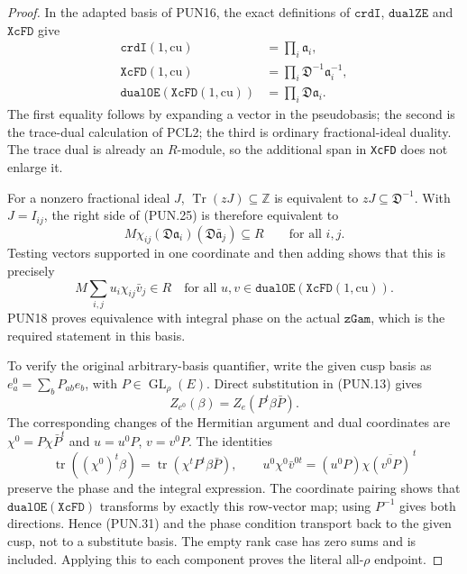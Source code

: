 \begin{proof}
In the adapted basis of PUN16, the exact definitions of
\(\texttt{crdI}\), \(\texttt{dualZE}\) and
\(\texttt{XcFD}\) give
\[
 \begin{split}
 \texttt{crdI}(1,\mathrm{cu})&=\prod_i\mathfrak a_i,\\
 \texttt{XcFD}(1,\mathrm{cu})&=
                      \prod_i\mathfrak D^{-1}\mathfrak a_i^{-1},\\
 \texttt{dualOE}(\texttt{XcFD}(1,\mathrm{cu}))&=
                      \prod_i\mathfrak D\mathfrak a_i.
 \end{split}                                                   \tag{PUN.29}
\]
The first equality follows by expanding a vector in the
pseudobasis; the second is the trace-dual calculation of PCL2;
the third is ordinary fractional-ideal duality.  The trace dual
is already an \(R\)-module, so the additional span in
\texttt{XcFD} does not enlarge it.

For a nonzero fractional ideal \(J\),
\(\operatorname{Tr}(zJ)\subseteq\mathbb Z\) is equivalent
to \(zJ\subseteq\mathfrak D^{-1}\).  With \(J=I_{ij}\),
the right side of (PUN.25) is therefore equivalent to
\[
     M\chi_{ij}(\mathfrak D\mathfrak a_i)
                     (\mathfrak D\bar{\mathfrak a}_j)\subseteq R
                            \qquad\text{for all }i,j.
 \tag{PUN.30}
\]
Testing vectors supported in one coordinate and then adding
shows that this is precisely
\[
    M\sum_{i,j}u_i\chi_{ij}\bar v_j\in R
       \quad\text{for all }u,v\in
                     \texttt{dualOE}(\texttt{XcFD}(1,\mathrm{cu})).
 \tag{PUN.31}
\]
PUN18 proves equivalence with integral phase on the actual
\(\texttt{zGam}\), which is the required statement in this
basis.

To verify the original arbitrary-basis quantifier, write the
given cusp basis as \(e_a^0=\sum_b P_{ab}e_b\), with
\(P\in\operatorname{GL}_\rho(E)\).  Direct substitution in
(PUN.13) gives
\[
 Z_{e^0}(\beta)=Z_e(P^t\beta\bar P).
 \tag{PUN.32}
\]
The corresponding changes of the Hermitian argument and dual
coordinates are \(\chi^0=P\chi\bar P^t\) and
\(u=u^0P\), \(v=v^0P\).  The identities
\[
 \operatorname{tr}((\chi^0)^t\beta)
       =\operatorname{tr}(\chi^tP^t\beta\bar P),
 \qquad
 u^0\chi^0\bar v^{0t}=(u^0P)\chi\overline{(v^0P)}^{\,t}
 \tag{PUN.33}
\]
preserve the phase and the integral expression.  The coordinate
pairing shows that \(\texttt{dualOE}(\texttt{XcFD})\) transforms
by exactly this row-vector map; using \(P^{-1}\) gives both
directions.  Hence (PUN.31) and the phase condition transport
back to the given cusp, not to a substitute basis.  The empty
rank case has zero sums and is included.  Applying this to
each component proves the literal all-\(\rho\) endpoint.
\end{proof}

